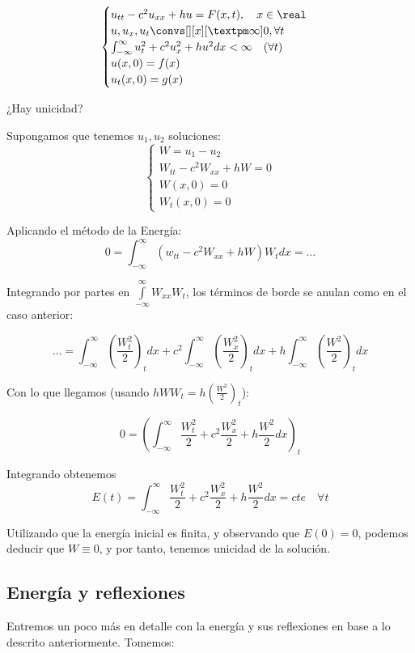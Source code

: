 			\begin{problem}
				\[\begin{cases}
					u_{tt} - c^2 u_{xx} + hu = F(x,t), \quad x \in \real \\
					u, u_x, u_t \convs[ ][x][±\infty] 0, \forall t\\
					\int_{-\infty}^\infty u_t^2 + c^2 u_x^2 + hu^2 dx < \infty \quad (\forall t) \\
					u(x,0) = f(x) \\
					u_t(x,0) = g(x)
				\end{cases}\]

				¿Hay unicidad?

				\solution

				Supongamos que tenemos $u_1,u_2$ soluciones:
				\[\begin{cases}
					W = u_1 - u_2 \\
					W_{tt} - c^2 W_{xx} + h W = 0\\
					W(x,0) = 0\\
					W_t(x,0)=0
				\end{cases}\]

				Aplicando el método de la Energía:
				\[ 0 = \int_{-\infty}^\infty (w_{tt} - c^2 W_{xx} + h W)W_t dx = … \]

				Integrando por partes en $\int\limits_{-\infty}^\infty W_{xx} W_{t}$, los términos de borde se anulan como en el caso anterior:

				\[ … = \int_{-\infty}^{\infty}  \left(\frac{W_t^2}{2}\right)_t dx + c^2 \int_{-\infty}^\infty \left(\frac{W_x^2}{2}\right)_t dx + h \int_{-\infty}^\infty \left(\frac{W^2}{2}\right)_t dx \]

				Con lo que llegamos (usando $hWW_t = h (\frac{W^2}{2})_t$):

				\[ 0 = \left(\int_{-\infty}^\infty  \frac{W_t^2}{2} + c^2 \frac{W_x^2}{2} + h \frac{W^2}{2} dx \right)_t\]

				Integrando obtenemos
				\[ E(t) = \int_{-\infty}^{\infty} \frac{W_t^2}{2} + c^2 \frac{W_x^2}{2} + h \frac{W^2}{2} dx = cte \quad \forall t \]

				Utilizando que la energía inicial es finita, y observando que $E(0) = 0$, podemos deducir que $W \equiv 0$, y por tanto, tenemos unicidad de la solución.

			\end{problem}

			\subsection{Energía y reflexiones}
			Entremos un poco más en detalle con la energía y sus reflexiones en base a lo descrito anteriormente. Tomemos:

